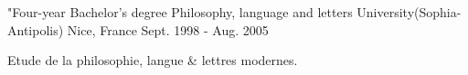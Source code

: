 

\begin{cventries}

  \cventry
    {"Four-year Bachelor's degree Philosophy, language and letters} %
    {University(Sophia-Antipolis)} %
    {Nice, France} %
    {Sept. 1998 - Aug. 2005} %
    {
      \begin{cvitems} %
        \item {Etude de la philosophie, langue \& lettres modernes.}
      \end{cvitems}
    }

\end{cventries}
